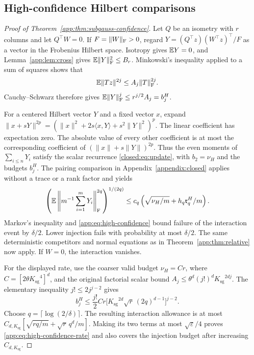 \documentclass[11pt,a4paper]{article}
\theoremstyle{definition}\newtheorem{definition}[theorem]{Definition}
\theoremstyle{remark}\newtheorem{remark}[theorem]{Remark}
\numberwithin{equation}{section}
\newcommand{\Ksg}{{K_{\mathrm{sg}}}}\newcommand{\Cfour}{{C_4}}
\newcommand{\Rmom}{\mathfrak r}
\newcommand{\norm}[1]{\lVert#1\rVert}\newcommand{\ip}[2]{\langle#1,#2\rangle}
\begin{document}
\subsection{High-confidence Hilbert comparisons}\label{appendix:hilbert}
\begin{proof}[Proof of Theorem~\ref{app:thm:subgauss-confidence}]
Let $Q$ be an isometry with $r$ columns and let $Q^\top W=0$.
If $F=\norm W_\F>0$, regard
$Y=(Q^\top z)(W^\top z)^\top/F$ as a vector in the Frobenius
Hilbert space. Isotropy gives $\mathbb E Y=0$, and
Lemma~\ref{app:lem:cross} gives $\E\norm Y_\F^2\le B_r$.
Minkowski's inequality applied to a sum of squares shows that
\[
 \E\norm{Tz}^{2j}\le A_j\norm T_\F^{2j}.
\]
Cauchy--Schwarz therefore gives
$\E\norm Y_\F^j\le r^{j/2}A_j=b_j^H$.

For a centered Hilbert vector $Y$ and a fixed vector $x$, expand
$\norm{x+sY}^{2p}=(\norm x^2+2s\ip xY+s^2\norm Y^2)^p$.
The linear coefficient has expectation zero. The absolute value of
every other coefficient is at most the corresponding coefficient of
$(\norm x+s\norm Y)^{2p}$. Thus the even moments of
$\sum_{i\le n}Y_i$ satisfy the scalar recurrence
\eqref{closed:eq:update}, with $b_2=\nu_H$ and the budgets $b_j^H$.
The pairing comparison in Appendix~\ref{appendix:closed} applies
without a trace or a rank factor and yields
\[
 \left(\E\left\|m^{-1}\sum_{i=1}^mY_i\right\|_\F^{2q}\right)^{1/(2q)}
 \le c_q\left(\sqrt{\nu_H/m}+h_q\Rmom_q^H/m\right).
\]
Markov's inequality and \eqref{app:eq:high-confidence} bound failure
of the interaction event by $\delta/2$. Lower injection fails with
probability at most $\delta/2$. The same deterministic competitors
and normal equations as in Theorem~\ref{app:thm:relative} now apply.
If $W=0$, the interaction vanishes.

For the displayed rate, use the coarser valid budget
$\nu_H=Cr$, where $C=[2\theta\Ksg^4]^d$, and the original
factorial scalar bound $A_j\le\theta^d(j!)^d\Ksg^{2dj}$.
The elementary inequality $j!\le2j^{j-2}$ gives
\[
 b_j^H\le\frac{j!}{2}Cr
   \bigl[\Ksg^{2d}\sqrt r\,(2q)^{d-1}\bigr]^{j-2}.
\]
Choose $q=\lceil\log(2/\delta)\rceil$. The resulting interaction
allowance is at most
$C_{d,\Ksg}[\sqrt{rq/m}+\sqrt r\,q^d/m]$.
Making its two terms at most $\sqrt\varepsilon/4$ proves
\eqref{app:eq:high-confidence-rate} and also covers the injection
budget after increasing $C_{d,\Ksg}$.
\end{proof}
\end{document}
